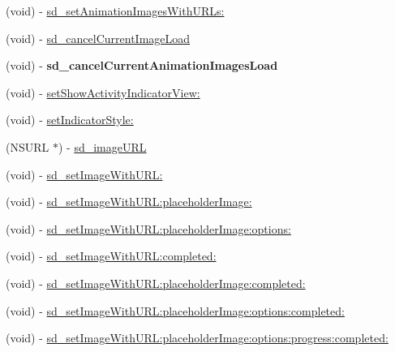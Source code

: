 \begin{DoxyCompactItemize}
\item 
(void) -\/ \mbox{\hyperlink{category_u_i_image_view_07_web_cache_08_a3d9c6bf83abb348e4130429f2087b8af}{sd\+\_\+set\+Animation\+Images\+With\+U\+R\+Ls\+:}}
\item 
(void) -\/ \mbox{\hyperlink{category_u_i_image_view_07_web_cache_08_a5ff7ec2145bd69460982ea6bd3b6026e}{sd\+\_\+cancel\+Current\+Image\+Load}}
\item 
\mbox{\label{category_u_i_image_view_07_web_cache_08_a3342e1c1ee44e86559b07b39fafebac1}} 
(void) -\/ {\bfseries sd\+\_\+cancel\+Current\+Animation\+Images\+Load}
\item 
(void) -\/ \mbox{\hyperlink{category_u_i_image_view_07_web_cache_08_a9f8a8476a2e362282980bfd4fd4cdb1a}{set\+Show\+Activity\+Indicator\+View\+:}}
\item 
(void) -\/ \mbox{\hyperlink{category_u_i_image_view_07_web_cache_08_a951036cd5b2847b39b0e3a372423fa4e}{set\+Indicator\+Style\+:}}
\item 
(N\+S\+U\+RL $\ast$) -\/ \mbox{\hyperlink{category_u_i_image_view_07_web_cache_08_abf2a037e36bc88eb9deeddbccd160755}{sd\+\_\+image\+U\+RL}}
\item 
(void) -\/ \mbox{\hyperlink{category_u_i_image_view_07_web_cache_08_a577e2abff6711b6eb793b6cd19f11dd3}{sd\+\_\+set\+Image\+With\+U\+R\+L\+:}}
\item 
(void) -\/ \mbox{\hyperlink{category_u_i_image_view_07_web_cache_08_a82e4106ff7460eff97dae9b79a539c41}{sd\+\_\+set\+Image\+With\+U\+R\+L\+:placeholder\+Image\+:}}
\item 
(void) -\/ \mbox{\hyperlink{category_u_i_image_view_07_web_cache_08_a4cc2a8f682e124d3df6495f74439a2cf}{sd\+\_\+set\+Image\+With\+U\+R\+L\+:placeholder\+Image\+:options\+:}}
\item 
(void) -\/ \mbox{\hyperlink{category_u_i_image_view_07_web_cache_08_a237803264855201b0f1150409fcbd74d}{sd\+\_\+set\+Image\+With\+U\+R\+L\+:completed\+:}}
\item 
(void) -\/ \mbox{\hyperlink{category_u_i_image_view_07_web_cache_08_afa4e73d2ffe8ee7c60b870a6730b7afd}{sd\+\_\+set\+Image\+With\+U\+R\+L\+:placeholder\+Image\+:completed\+:}}
\item 
(void) -\/ \mbox{\hyperlink{category_u_i_image_view_07_web_cache_08_ad2cf9154e98f4afdbba63251e3f1d1e5}{sd\+\_\+set\+Image\+With\+U\+R\+L\+:placeholder\+Image\+:options\+:completed\+:}}
\item 
(void) -\/ \mbox{\hyperlink{category_u_i_image_view_07_web_cache_08_a05de992a3162a51f223a248ceaa60856}{sd\+\_\+set\+Image\+With\+U\+R\+L\+:placeholder\+Image\+:options\+:progress\+:completed\+:}}

\end{DoxyCompactItemize}
